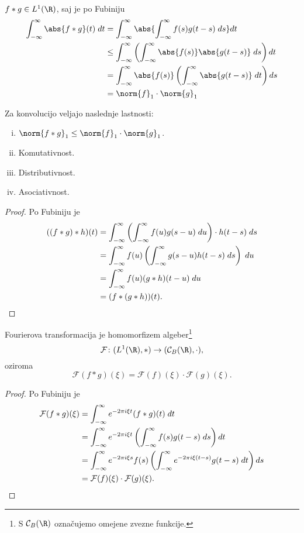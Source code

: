 \begin{opomba}
$f * g \in L^1(\R)$, saj je po Fubiniju
\begin{align*}
\int_{-\infty}^\infty \abs{f*g}(t)\;dt &=
\int_{-\infty}^\infty
\abs{\int_{-\infty}^\infty f(s) g(t - s)\;ds}dt
\\
&\leq
\int_{-\infty}^\infty \left(
\int_{-\infty}^\infty \abs{f(s)} \abs{g(t - s)}\;ds
\right)dt
\\
&=
\int_{-\infty}^\infty \abs{f(s)} \left(
\int_{-\infty}^\infty \abs{g(t - s)}\;dt
\right)ds
\\
&=
\norm{f}_1 \cdot \norm{g}_1
\end{align*}
\end{opomba}

\begin{trditev}
Za konvolucijo veljajo naslednje lastnosti:

\begin{enumerate}[i)]
\item $\norm{f*g}_1 \leq \norm{f}_1 \cdot \norm{g}_1$.
\item Komutativnost.
\item Distributivnost.
\item Asociativnost.
\end{enumerate}
\end{trditev}

\begin{proof}
Po Fubiniju je
\begin{align*}
((f*g)*h)(t) &=
\int_{-\infty}^\infty \left(
\int_{-\infty}^\infty f(u) g(s - u)\;du
\right) \cdot h(t - s)\;ds
\\
&=
\int_{-\infty}^\infty f(u) \left(
\int_{-\infty}^\infty g(s - u) h(t - s)\;ds
\right)\;du
\\
&=
\int_{-\infty}^\infty f(u) (g * h)(t - u)\;du
\\
&= (f*(g*h))(t). \qedhere
\end{align*}
\end{proof}

\begin{trditev}
Fourierova transformacija je homomorfizem algeber\footnote{S
$\mathcal{C}_B(\R)$ označujemo omejene zvezne funkcije.}
\[
\mathcal{F} \colon (L^1(\R),*) \to (\mathcal{C}_B(\R),\cdot),
\]
oziroma
\[
\mathcal{F}(f*g)(\xi) =
\mathcal{F}(f)(\xi) \cdot \mathcal{F}(g)(\xi).
\]
\end{trditev}

\begin{proof}
Po Fubiniju je
\begin{align*}
\mathcal{F}(f*g)(\xi) &=
\int_{-\infty}^\infty e^{-2 \pi i \xi t} (f*g)(t)\;dt
\\
&=
\int_{-\infty}^\infty e^{-2 \pi i \xi t} \left(
\int_{-\infty}^\infty f(s) g(t-s)\;ds
\right)dt
\\
&=
\int_{-\infty}^\infty e^{-2 \pi i \xi s} f(s) \left(
\int_{-\infty}^\infty e^{-2 \pi i \xi (t - s)} g(t-s)\;dt
\right)ds
\\
&=
\mathcal{F}(f)(\xi) \cdot \mathcal{F}(g)(\xi). \qedhere
\end{align*}
\end{proof}

